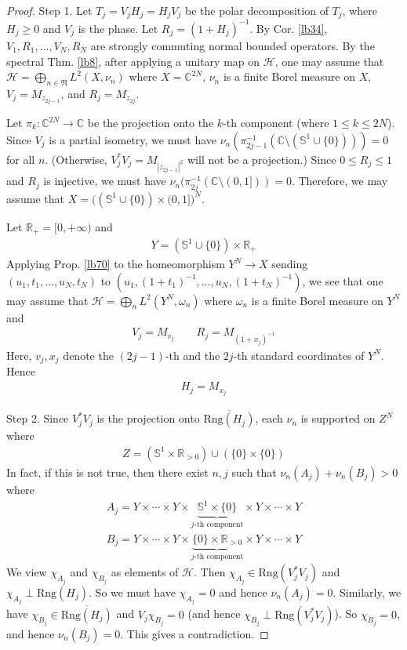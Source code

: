 \documentclass[12pt,b5paper,notitlepage]{article}
\theoremstyle{definition}
\theoremstyle{plain}
\newcommand{\fk}{\mathfrak}
\newcommand{\mc}{\mathcal}
\newcommand{\ovl}{\overline}
\newcommand{\mbb}{\mathbb}
\newcommand{\Cbb}{\mathbb C}
\newcommand{\Rbb}{\mathbb R}
\newcommand{\Rng}{\mathrm{Rng}}
\numberwithin{equation}{section}
\begin{document}
\begin{proof}
Step 1. Let $T_j=V_jH_j=H_jV_j$ be the polar decomposition of $T_j$, where $H_j\geq0$ and $V_j$ is the phase. Let $R_j=(1+H_j)^{-1}$. By Cor. \ref{lb34}, $V_1,R_1,\dots,V_N,R_N$ are strongly commuting normal bounded operators. By the spectral Thm. \ref{lb8}, after applying a unitary map on $\mc H$, one may assume that $\mc H=\bigoplus_{n\in\fk N} L^2(X,\nu_n)$ where $X=\Cbb^{2N}$, $\nu_n$ is a finite Borel measure on $X$, $V_j=M_{z_{2j-1}}$, and $R_j=M_{z_{2j}}$. 

Let $\pi_k:\Cbb^{2N}\rightarrow\Cbb$ be the projection onto the $k$-th component (where $1\leq k\leq 2N$). Since $V_j$ is a  partial isometry, we must have $\nu_n(\pi_{2j-1}^{-1}(\Cbb\setminus(\mbb S^1\cup\{0\})))=0$ for all $n$. (Otherwise, $V_j^*V_j=M_{|z_{2j-1}|^2}$ will not be a projection.) Since $0\leq R_j\leq 1$ and $R_j$ is injective, we must have $\nu_n(\pi_{2j}^{-1}(\Cbb\setminus(0,1]))=0$. Therefore, we may assume that $X=\big((\mbb S^1\cup\{0\})\times(0,1]\big)^N$.



Let $\Rbb_+=[0,+\infty)$ and
\begin{align*}
Y=(\mbb S^1\cup\{0\})\times\Rbb_+
\end{align*}
Applying Prop. \ref{lb70} to the homeomorphism $Y^N\rightarrow X$ sending $(u_1,t_1,\dots,u_N,t_N)$ to $(u_1,(1+t_1)^{-1},\dots,u_N,(1+t_N)^{-1})$, we see that one may assume that $\mc H=\bigoplus_n L^2(Y^N,\omega_n)$ where $\omega_n$ is a finite Borel measure on $Y^N$ and
\begin{gather*}
V_j=M_{v_j}\qquad R_j=M_{(1+x_j)^{-1}}
\end{gather*}
Here, $v_j,x_j$ denote the $(2j-1)$-th and the $2j$-th standard coordinates of $Y^N$. Hence
\begin{align*}
H_j=M_{x_j}
\end{align*}


Step 2. Since $V_j^*V_j$ is the projection onto $\ovl{\Rng(H_j)}$, each $\nu_n$ is supported on $Z^N$ where
\begin{align*}
Z=(\mbb S^1\times\Rbb_{>0})\cup (\{0\}\times\{0\})
\end{align*}
In fact, if this is not true, then there exist $n,j$ such that $\nu_n(A_j)+\nu_n(B_j)>0$ where
\begin{gather*}
A_j=Y\times\cdots\times Y\times \underbrace{\mbb S^1\times\{0\}}_{j\text{-th component}}\times Y\times\cdots\times Y\\
B_j=Y\times\cdots\times Y\times \underbrace{\{0\}\times\Rbb_{>0}}_{j\text{-th component}}\times Y\times\cdots\times Y
\end{gather*}
We view $\chi_{A_j}$ and $\chi_{B_j}$ as elements of $\mc H$. Then $\chi_{A_j}\in\Rng (V_j^*V_j)$ and $\chi_{A_j}\perp \Rng(H_j)$. So we must have $\chi_{A_j}=0$ and hence $\nu_n(A_j)=0$. Similarly, we have $\chi_{B_j}\in\ovl{\Rng(H_j)}$ and $V_j\chi_{B_j}=0$ (and hence $\chi_{B_j}\perp \Rng(V_j^*V_j)$). So $\chi_{B_j}=0$, and hence $\nu_n(B_j)=0$. This gives a contradiction.


\end{proof}
\end{document}
